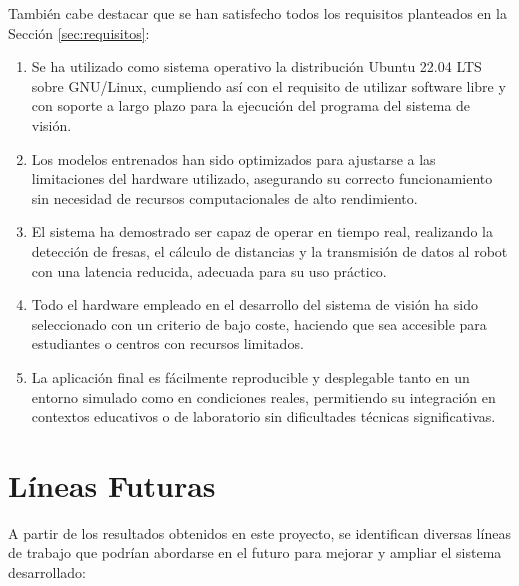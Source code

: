 También cabe destacar que se han satisfecho todos los requisitos planteados en la Sección \ref{sec:requisitos}:

\begin{enumerate}
    \item Se ha utilizado como sistema operativo la distribución Ubuntu 22.04 LTS sobre GNU/Linux, cumpliendo así con el requisito de utilizar software libre y con soporte a largo plazo para la ejecución del programa del sistema de visión.
    \item Los modelos entrenados han sido optimizados %
    para ajustarse a las limitaciones del hardware utilizado, asegurando su correcto funcionamiento sin necesidad de recursos computacionales de alto rendimiento.
    \item El sistema ha demostrado ser capaz de operar en tiempo real, realizando la detección de fresas, el cálculo de distancias y la transmisión de datos al robot con una latencia reducida, adecuada para su uso práctico.
    \item Todo el hardware empleado en el desarrollo del sistema de visión ha sido seleccionado con un criterio de bajo coste, haciendo que %
    sea accesible para estudiantes o centros con recursos limitados.
    \item La aplicación final es fácilmente reproducible y desplegable tanto en un entorno simulado %
    como en condiciones reales, permitiendo su integración en contextos educativos o de laboratorio sin dificultades técnicas significativas.
\end{enumerate}

\section{Líneas Futuras}
\label{sec:lineas_futuras}

A partir de los resultados obtenidos en este proyecto, se identifican diversas líneas de trabajo que podrían abordarse en el futuro para mejorar y ampliar el sistema desarrollado:


